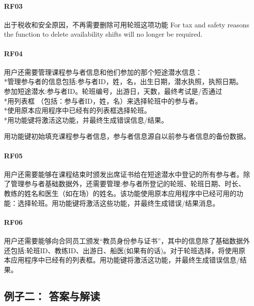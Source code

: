 \hypertarget{rf03}{%
\paragraph{RF03}\label{rf03}}

出于税收和安全原因，不再需要删除可用轮班这项功能 For tax and safety
reasons the function to delete availability shifts will no longer be
required.

\hypertarget{rf04}{%
\paragraph{RF04}\label{rf04}}

用户还需要管理课程参与者信息和他们参加的那个短途潜水信息：\\
*管理参与者的信息包括:参与者ID，姓，名，出生日期，潜水执照，执照日期。\\
参加短途潜水:参与者ID。轮班编号，出游日，天数，最终考试是/否通过\\
*用列表框 （包括：参与者ID，姓，名）来选择轮班中的参与者。\\
*使用原本应用程序中已经有的列表框选择轮班。\\
*用功能键将激活这功能，并最终生成错误信息/结果。

用功能键初始填充课程参与者信息，参与者信息源自以前参与者信息的备份数据。

\hypertarget{rf05}{%
\paragraph{RF05}\label{rf05}}

用户还需要能够在课程结束时颁发出席证书给在短途潜水中登记的所有参与者。除了管理参与者基础数据外，还需要管理:参与者所登记的轮班、轮班日期、时长、教练的姓名和医生（如在场）的姓名。该功能使用原本应用程序中已经可用的功能：选择轮班。用功能键将激活这些功能，并最终生成错误/结果消息。

\hypertarget{rf06}{%
\paragraph{RF06}\label{rf06}}

用户还需要能够向合同员工颁发``教员身份参与证书''，其中的信息除了基础数据外还包括:轮班ID、教练ID、出游日、船医(如果有的话)。对于轮班选择，将使用原本应用程序中已经有的列表框。用功能键将激活这功能，并最终生成错误信息/结果。

\hypertarget{ux4f8bux5b50ux4e8c-ux7b54ux6848ux4e0eux89e3ux8bfb}{%
\subsection{例子二：
答案与解读}\label{ux4f8bux5b50ux4e8c-ux7b54ux6848ux4e0eux89e3ux8bfb}}

